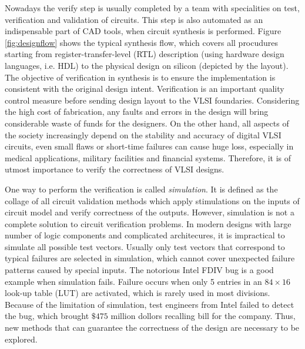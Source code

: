Nowadays the verify step is usually completed by a team with specialities on test, verification and validation of 
circuits. This step is also automated as an indispensable part of CAD tools, when circuit synthesis is performed. 
Figure \ref{fig:designflow} shows the typical synthesis flow, which covers all procudures starting from 
register-transfer-level (RTL) description (using hardware design languages, i.e. HDL) to  the 
physical design on silicon (depicted by the layout). The objective of verification in synthesis is 
to ensure the implementation is consistent with the original design intent. Verification is 
an important quality control measure before sending design layout to the VLSI foundaries.
Considering the high cost of fabrication, any faults and errors in the design will bring considerable 
waste of funds for the designers. On the other hand, all aspects of the society increasingly depend on 
the stability and accuracy of digital VLSI circuits, even small flaws or short-time failures can cause 
huge loss, especially in medical applications, military facilities and financial systems.
Therefore, it is of utmost importance to verify the correctness of VLSI designs.

One way to perform the verification is called {\it simulation}. It is defined as the collage of all circuit validation 
methods which apply stimulations on the inputs of circuit model and verify correctness of the outputs.
However, simulation is not a complete solution to circuit verification problems. In modern designs with 
large number of logic components and complicated architecures, it is impractical to simulate all possible 
test vectors. Usually only test vectors that correspond to typical failures are selected in simulation, which 
cannot cover unexpected failure patterns caused by special inputs. The notorious Intel FDIV bug \cite{nicely:FDIV}
is a good example when simulation fails. Failure occurs when only 5 entries in an $84\times 16$ look-up table
(LUT) are activated,  which is rarely used in most divisions. Because of the limitation of simulation,  
test engineers from Intel failed to detect the bug,  which brought $\$475$ million dollors recalling bill
for the company. Thus,  new methods that can guarantee the correctness of the design are necessary to be explored.

